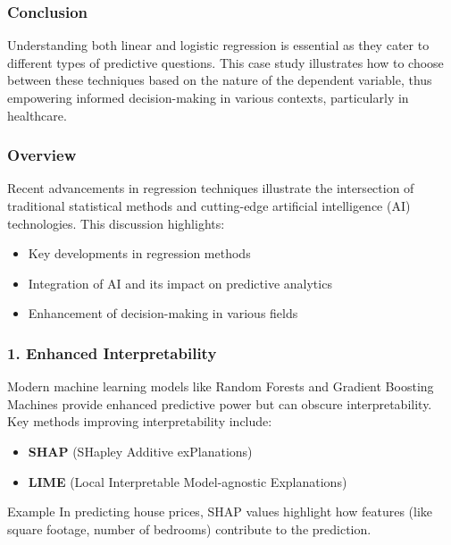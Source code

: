 \documentclass[aspectratio=169]{beamer}
\begin{document}
\begin{frame}[fragile]
    \frametitle{Conclusion}
    Understanding both linear and logistic regression is essential as they cater to different types of predictive questions. This case study illustrates how to choose between these techniques based on the nature of the dependent variable, thus empowering informed decision-making in various contexts, particularly in healthcare.
\end{frame}

\begin{frame}
    \titlepage
\end{frame}

\begin{frame}[fragile]
    \frametitle{Overview}
    Recent advancements in regression techniques illustrate the intersection of traditional statistical methods and cutting-edge artificial intelligence (AI) technologies. 
    This discussion highlights:
    \begin{itemize}
        \item Key developments in regression methods
        \item Integration of AI and its impact on predictive analytics
        \item Enhancement of decision-making in various fields
    \end{itemize}
\end{frame}

\begin{frame}[fragile]
    \frametitle{1. Enhanced Interpretability}
    Modern machine learning models like Random Forests and Gradient Boosting Machines provide enhanced predictive power but can obscure interpretability. 
    Key methods improving interpretability include:
    \begin{itemize}
        \item \textbf{SHAP} (SHapley Additive exPlanations)
        \item \textbf{LIME} (Local Interpretable Model-agnostic Explanations)
    \end{itemize}
    
    \begin{block}{Example}
        In predicting house prices, SHAP values highlight how features (like square footage, number of bedrooms) contribute to the prediction.
    \end{block}
\end{frame}
\end{document}
